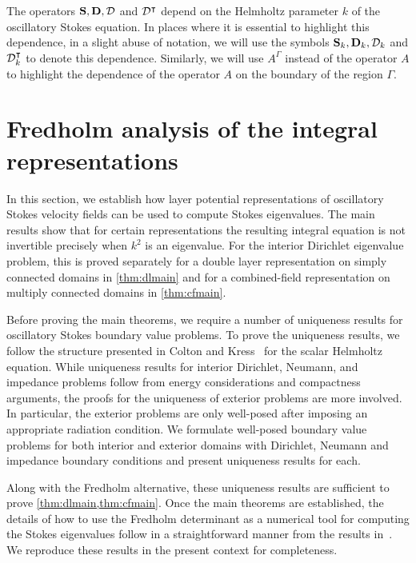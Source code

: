 \begin{remark}
The operators ${\bf S},{\bf D},{\mathcal D}$ and ${\mathcal D}^{\intercal}$
depend on the Helmholtz parameter $k$ of the oscillatory Stokes equation.
In places where it is essential to highlight this dependence, in a slight
abuse of notation, we will use the symbols ${\bf S}_{k}, {\bf D}_{k},{\mathcal D}_{k}$ and ${\mathcal D}^{\intercal}_{k}$ to 
denote this dependence.
Similarly, we will use $A^{\Gamma}$ instead of the operator $A$ to highlight 
the dependence of the operator $A$ on the boundary of the region $\Gamma$.
\end{remark}


%
\section{Fredholm analysis of the integral representations}
\label{sec:analysis}
In this section, we establish how layer potential
representations of oscillatory Stokes velocity fields
can be used to compute Stokes eigenvalues.
%
The main results show that for certain representations
the resulting integral equation is not invertible precisely
when $k^2$ is an eigenvalue.
%
For the interior Dirichlet eigenvalue problem, this is
proved separately for a double layer representation on
simply connected domains in \cref{thm:dlmain} and
for a combined-field representation on multiply connected
domains in \cref{thm:cfmain}.
%

Before proving the main theorems, we require a number
of uniqueness results for oscillatory Stokes boundary
value problems.
%
To prove the uniqueness results, we follow the 
structure presented in Colton and Kress~\cite[Ch. 3]{colton1983integral}
for the scalar Helmholtz equation.
%
While uniqueness results for interior Dirichlet,
Neumann, and impedance problems follow from energy
considerations and compactness arguments, the proofs
for the uniqueness of exterior problems are more
involved.
%
In particular, the exterior problems are only 
well-posed after imposing an appropriate radiation
condition.
%
We formulate well-posed boundary value problems 
for both interior and exterior domains with
Dirichlet, Neumann and impedance boundary
conditions and present uniqueness results for
each.


Along with the Fredholm alternative, these uniqueness
results are sufficient to prove
\cref{thm:dlmain,thm:cfmain}.
%
Once the main theorems are established,
the details of how to use the Fredholm determinant
as a numerical tool for computing the Stokes eigenvalues
follow in a straightforward manner from the results
in~\cite{zhao2015robust}.
%
We reproduce these results in the present
context for completeness.

